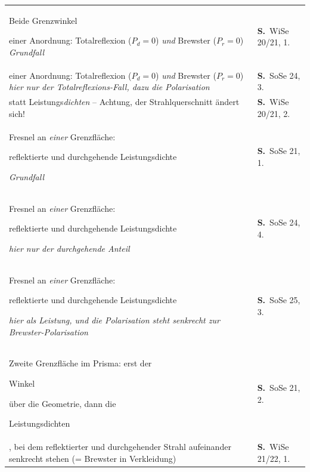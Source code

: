 \documentclass[a4paper,10pt]{article}
\newcommand{\gs}[1]{{\setlength{\fboxsep}{0.5mm}%
  \colorbox{MarkerG!45}{\strut #1}}}
\begin{document}
\begin{tabularx}{\textwidth}{@{}>{\RaggedRight}X>{\RaggedRight\scriptsize}p{27mm}@{}}
\hline\rule{0pt}{3.5mm}
\gs{Beide Grenzwinkel} einer Anordnung: Totalreflexion ($P_d=0$) \emph{und} Brewster ($P_r=0$) \newline \hspace*{3mm}\textcolor{Grau}{\itshape \textendash{} Grundfall} & \textbf{S.\,\pageref{tf:WiSe20x21:3:1}} \textcolor{Grau}{WiSe 20/21, 1.} \\
\gs{Beide Grenzwinkel} einer Anordnung: Totalreflexion ($P_d=0$) \emph{und} Brewster ($P_r=0$) \newline \hspace*{3mm}\textcolor{Grau}{\itshape \textendash{} hier nur der Totalreflexions-Fall, dazu die Polarisation} & \textbf{S.\,\pageref{tf:SoSe24:3:3}} \textcolor{Grau}{SoSe 24, 3.} \\
\gs{Leistungen $P_r$ und $P_d$} statt Leistungs\emph{dichten} -- Achtung, der Strahlquerschnitt ändert sich! & \textbf{S.\,\pageref{tf:WiSe20x21:3:2}} \textcolor{Grau}{WiSe 20/21, 2.} \\
Fresnel an \emph{einer} Grenzfläche: \gs{reflektierte und durchgehende Leistungsdichte} \newline \hspace*{3mm}\textcolor{Grau}{\itshape \textendash{} Grundfall} & \textbf{S.\,\pageref{tf:SoSe21:3:1}} \textcolor{Grau}{SoSe 21, 1.} \\
Fresnel an \emph{einer} Grenzfläche: \gs{reflektierte und durchgehende Leistungsdichte} \newline \hspace*{3mm}\textcolor{Grau}{\itshape \textendash{} hier nur der durchgehende Anteil} & \textbf{S.\,\pageref{tf:SoSe24:3:4}} \textcolor{Grau}{SoSe 24, 4.} \\
Fresnel an \emph{einer} Grenzfläche: \gs{reflektierte und durchgehende Leistungsdichte} \newline \hspace*{3mm}\textcolor{Grau}{\itshape \textendash{} hier als Leistung, und die Polarisation steht senkrecht zur Brewster-Polarisation} & \textbf{S.\,\pageref{tf:SoSe25:3:3}} \textcolor{Grau}{SoSe 25, 3.} \\
Zweite Grenzfläche im Prisma: erst der \gs{Winkel} über die Geometrie, dann die \gs{Leistungsdichten} & \textbf{S.\,\pageref{tf:SoSe21:3:2}} \textcolor{Grau}{SoSe 21, 2.} \\
\gs{Einfallswinkel}, bei dem reflektierter und durchgehender Strahl aufeinander senkrecht stehen (= Brewster in Verkleidung) & \textbf{S.\,\pageref{tf:WiSe21x22:3:1}} \textcolor{Grau}{WiSe 21/22, 1.} \\

\end{tabularx}
\end{document}
